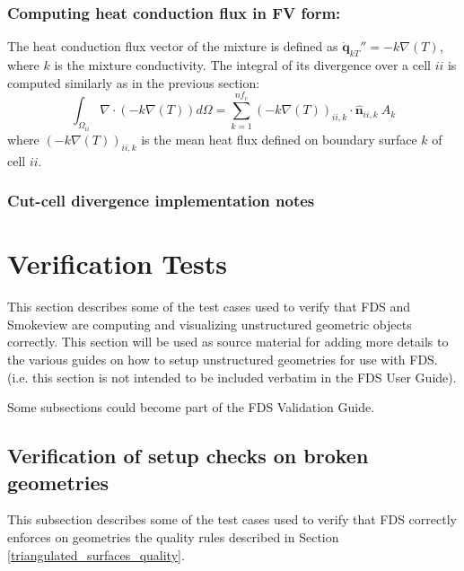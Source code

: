 \documentclass[12pt]{article}
\begin{document}
\subsubsection{Computing heat conduction flux in FV form:}


The heat conduction flux vector of the mixture is defined as $\dot{\mathbf{q}}_{kT}''= -k \nabla(T)$, where $k$ is the mixture conductivity. The integral of its divergence over a cell $ii$ is computed similarly as in the previous section:
\begin{equation}
    \int_{\Omega_{ii}} {\nabla \cdot \left(-k \nabla(T)\right)} d\Omega = \sum_{k=1}^{nf_c} \left(-k \nabla(T) \right)_{ii,k} \cdot \hat{\mathbf{n}}_{ii,k}  \: A_k
\end{equation}
where $\left(-k \nabla(T) \right)_{ii,k}$ is the mean heat flux defined on boundary surface $k$ of cell $ii$.





\subsubsection{Cut-cell divergence implementation notes}





\section{Verification Tests}

This section describes some of the test cases used to verify that FDS and Smokeview are computing
and visualizing unstructured geometric objects correctly.  This section will be used as source material for adding
more details to the various guides on how to setup unstructured geometries for use with FDS. (i.e. this section
is not intended to be included verbatim in the FDS User Guide).

Some subsections could become part of the FDS Validation Guide.

\newcommand{\figheightD}{2.75in}

\subsection{Verification of setup checks on broken geometries}

This subsection describes some of the test cases used to verify that FDS correctly enforces on geometries
the quality rules described in Section \ref{triangulated_surfaces_quality}.
\end{document}
